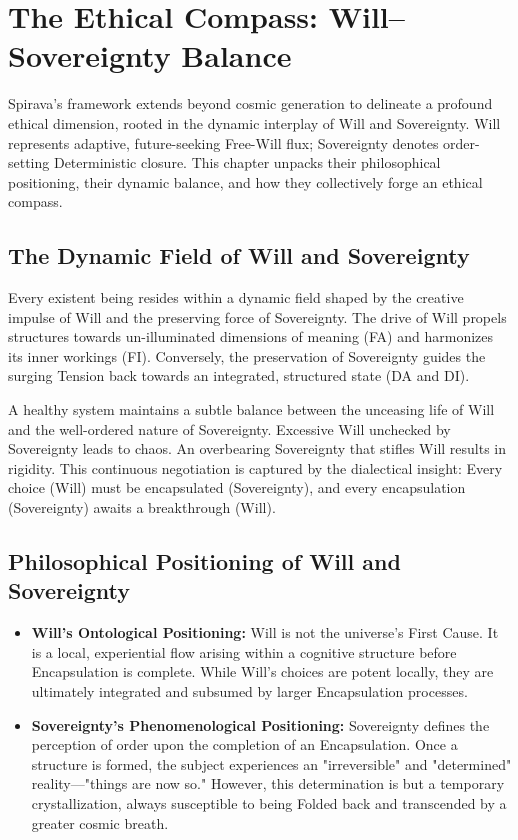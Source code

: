 \documentclass[11pt, a4paper]{article}
\begin{document}
\section{The Ethical Compass: Will–Sovereignty Balance}
Spirava's framework extends beyond cosmic generation to delineate a profound ethical dimension, rooted in the dynamic interplay of Will and Sovereignty. Will represents adaptive, future-seeking Free-Will flux; Sovereignty denotes order-setting Deterministic closure. This chapter unpacks their philosophical positioning, their dynamic balance, and how they collectively forge an ethical compass.

\subsection{The Dynamic Field of Will and Sovereignty}
Every existent being resides within a dynamic field shaped by the creative impulse of Will and the preserving force of Sovereignty. The drive of Will propels structures towards un-illuminated dimensions of meaning (FA) and harmonizes its inner workings (FI). Conversely, the preservation of Sovereignty guides the surging Tension back towards an integrated, structured state (DA and DI).

A healthy system maintains a subtle balance between the unceasing life of Will and the well-ordered nature of Sovereignty. Excessive Will unchecked by Sovereignty leads to chaos. An overbearing Sovereignty that stifles Will results in rigidity. This continuous negotiation is captured by the dialectical insight: Every choice (Will) must be encapsulated (Sovereignty), and every encapsulation (Sovereignty) awaits a breakthrough (Will).

\subsection{Philosophical Positioning of Will and Sovereignty}
\begin{itemize}
    \item \textbf{Will's Ontological Positioning:} Will is not the universe's First Cause. It is a local, experiential flow arising within a cognitive structure before Encapsulation is complete. While Will's choices are potent locally, they are ultimately integrated and subsumed by larger Encapsulation processes.
    \item \textbf{Sovereignty's Phenomenological Positioning:} Sovereignty defines the perception of order upon the completion of an Encapsulation. Once a structure is formed, the subject experiences an "irreversible" and "determined" reality—"things are now so." However, this determination is but a temporary crystallization, always susceptible to being Folded back and transcended by a greater cosmic breath.
\end{itemize}
\end{document}

